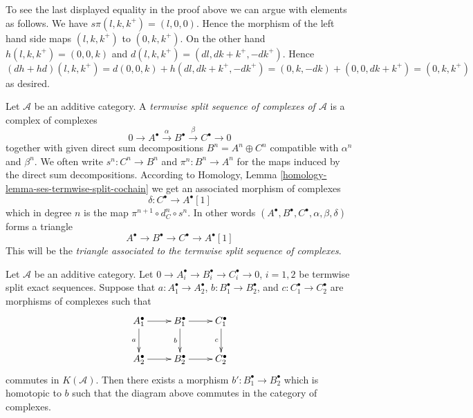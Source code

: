 \begin{remark}
\label{remark-compute-modules}
To see the last displayed equality in the proof above we can argue
with elements as follows. We have
$s\pi(l, k, k^{+}) = (l, 0, 0)$.
Hence the morphism of the left hand side maps
$(l, k, k^{+})$ to $(0, k, k^{+})$.
On the other hand $h(l, k, k^{+}) = (0, 0, k)$ and
$d(l, k, k^{+}) = (dl, dk + k^{+}, -dk^{+})$.
Hence $(dh + hd)(l, k, k^{+}) =
d(0, 0, k) + h(dl, dk + k^{+}, -dk^{+}) =
(0, k, -dk) + (0, 0, dk + k^{+}) = (0, k, k^{+})$
as desired.
\end{remark}

\begin{definition}
\label{definition-split-ses}
Let $\mathcal{A}$ be an additive category.
A {\it termwise split sequence of complexes of $\mathcal{A}$}
is a complex of complexes
$$
0 \to
A^\bullet \xrightarrow{\alpha}
B^\bullet \xrightarrow{\beta}
C^\bullet \to 0
$$
together with given direct sum decompositions
$B^n = A^n \oplus C^n$
compatible with $\alpha^n$ and $\beta^n$.
We often write $s^n : C^n \to B^n$ and $\pi^n : B^n \to A^n$
for the maps induced by the direct sum decompositions.
According to
Homology, Lemma \ref{homology-lemma-ses-termwise-split-cochain}
we get an associated morphism of complexes
$$
\delta : C^\bullet \longrightarrow A^\bullet[1]
$$
which in degree $n$ is the map $\pi^{n + 1} \circ d_C^n \circ s^n$.
In other words
$(A^\bullet, B^\bullet, C^\bullet, \alpha, \beta, \delta)$
forms a triangle
$$
A^\bullet \to B^\bullet \to C^\bullet \to A^\bullet[1]
$$
This will be the {\it triangle associated to the termwise
split sequence of complexes}.
\end{definition}

\begin{lemma}
\label{lemma-make-commute}
Let $\mathcal{A}$ be an additive category.
Let $0 \to A_i^\bullet \to B_i^\bullet \to C_i^\bullet \to 0$, $i = 1, 2$
be termwise split exact sequences. Suppose that
$a : A_1^\bullet \to A_2^\bullet$,
$b : B_1^\bullet \to B_2^\bullet$, and
$c : C_1^\bullet \to C_2^\bullet$ are morphisms of complexes
such that
$$
\xymatrix{
A_1^\bullet \ar[d]_a \ar[r] &
B_1^\bullet \ar[r] \ar[d]_b &
C_1^\bullet \ar[d]_c \\
A_2^\bullet \ar[r] & B_2^\bullet \ar[r] & C_2^\bullet
}
$$
commutes in $K(\mathcal{A})$. Then there exists a morphism
$b' : B_1^\bullet \to B_2^\bullet$
which is homotopic to $b$ such that the diagram above commutes
in the category of complexes.
\end{lemma}

